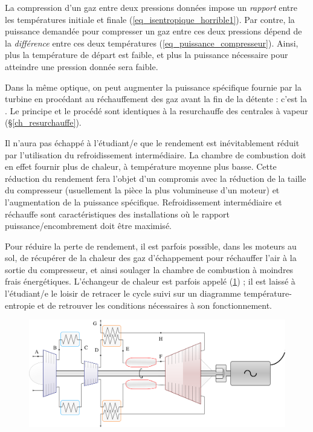 		La compression d’un gaz entre deux pressions données impose un \emph{rapport} entre les températures initiale et finale (\ref{eq_isentropique_horrible1}). Par contre, la puissance demandée pour compresser un gaz entre ces deux pressions dépend de la \emph{différence} entre ces deux températures (\ref{eq_puissance_compresseur}). Ainsi, plus la température de départ est faible, et plus la puissance nécessaire pour atteindre une pression donnée sera faible.

		Dans la même optique, on peut augmenter la puissance spécifique fournie par la turbine en procédant au réchauffement des gaz avant la fin de la détente : c’est la . Le principe et le procédé sont identiques à la resurchauffe des centrales à vapeur (\S\ref{ch_resurchauffe}).

		Il n’aura pas échappé à l’étudiant/e que le rendement est inévitablement réduit par l’utilisation du refroidissement intermédiaire. La chambre de combustion doit en effet fournir plus de chaleur, à température moyenne plus basse. Cette réduction du rendement fera l’objet d’un compromis avec la réduction de la taille du compresseur (usuellement la pièce la plus volumineuse d’un moteur) et l’augmentation de la puissance spécifique. Refroidissement intermédiaire et réchauffe sont caractéristiques des installations où le rapport puissance/encombrement doit être maximisé.

		Pour réduire la perte de rendement, il est parfois possible, dans les moteurs au sol, de récupérer de la chaleur des gaz d’échappement pour réchauffer l’air à la sortie du compresseur, et ainsi soulager la chambre de combustion à moindres frais énergétiques. L’échangeur de chaleur est parfois appelé  (\cref{fig_intercooler_echangeur}) ; il est laissé à l’étudiant/e le loisir de retracer le cycle suivi sur un diagramme température-entropie et de retrouver les conditions nécessaires à son fonctionnement.
		
		\begin{figure}
			\begin{center}
				\includegraphics[scale=0.6]{images/circuit_intercooler_echangeur.png}
			\end{center}
			\label{fig_intercooler_echangeur}
		\end{figure}

